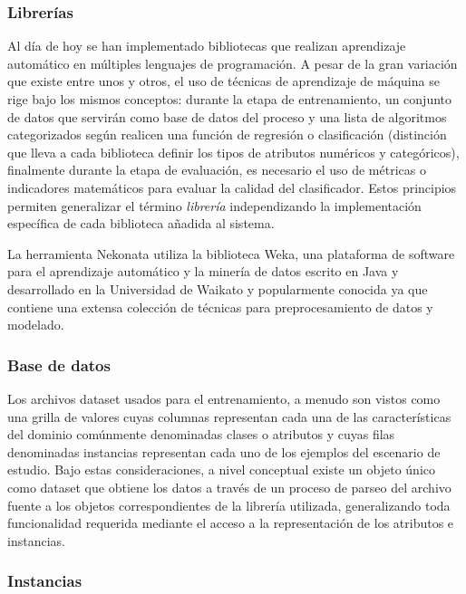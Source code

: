 \subsubsection*{Librerías}

Al día de hoy se han implementado bibliotecas que realizan aprendizaje
automático en múltiples lenguajes de programación. A pesar de la gran
variación que existe entre unos y otros, el uso de técnicas de aprendizaje
de máquina se rige bajo los mismos conceptos: durante la etapa de
entrenamiento, un conjunto de datos que servirán como base de datos
del proceso y una lista de algoritmos categorizados según realicen
una función de regresión o clasificación (distinción que lleva a cada
biblioteca definir los tipos de atributos numéricos y categóricos),
finalmente durante la etapa de evaluación, es necesario el uso de
métricas o indicadores matemáticos para evaluar la calidad del clasificador.
Estos principios permiten generalizar el término \emph{librería} independizando
la implementación específica de cada biblioteca añadida al sistema. 

La herramienta Nekonata utiliza la biblioteca Weka, una plataforma
de software para el aprendizaje automático y la minería de datos escrito
en Java y desarrollado en la Universidad de Waikato y popularmente
conocida ya que contiene una extensa colección de técnicas para preprocesamiento
de datos y modelado. 


\subsubsection*{Base de datos}

Los archivos dataset usados para el entrenamiento, a menudo son vistos
como una grilla de valores cuyas columnas representan cada una de
las características del dominio comúnmente denominadas clases o atributos
y cuyas filas denominadas instancias representan cada uno de los ejemplos
del escenario de estudio. Bajo estas consideraciones, a nivel conceptual
existe un objeto único como dataset que obtiene los datos a través
de un proceso de parseo del archivo fuente a los objetos correspondientes
de la librería utilizada, generalizando toda funcionalidad requerida
mediante el acceso a la representación de los atributos e instancias. 


\subsubsection*{Instancias}

